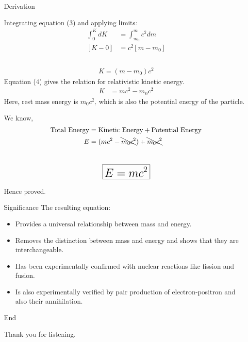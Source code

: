 \documentclass[11pt]{beamer}
\begin{document}
\begin{frame}[t,allowframebreaks]{Derivation}
        \framebreak

        Integrating equation (3) and applying limits:
        \begin{align*}
            \int_{0}^{K} dK &= \int_{m_0}^{m} c^2 dm\\[5pt]
            [K - 0] &= c^2 [m - m_0]\\
        \end{align*}~\\[-50pt]
        \begin{align}
            \boxed{K = (m - m_0) c^2}
        \end{align}
        Equation (4) gives the relation for relativistic kinetic energy.
        \begin{align*}
            K &= mc^2 - m_0 c^2
        \end{align*}
        Here, rest mass energy is $m_0 c^2$, which is also the potential energy of the particle.

        \framebreak

        We know,\\[-20pt]
        \begin{align*}
            \text{Total Energy} &= \text{Kinetic Energy} + \text{Potential Energy}\\
            E & = (mc^2 - \bcancel{m_0 c^2}) + \bcancel{m_0 c^2}\\
        \end{align*}~\\[-40pt]
        \begin{align*}
            \LARGE\boxed{E = mc^2}
        \end{align*}
        \begin{center}
            Hence proved.
        \end{center}
    \end{frame}

    \begin{frame}[t]{Significance}
        The resulting equation:\\[10pt]
        \begin{itemize}
            \item Provides a universal relationship between mass and energy.
            \item Removes the distinction between mass and energy and shows that they are interchangeable.
            \item Has been experimentally confirmed with nuclear reactions like fission and fusion.
            \item Is also experimentally verified by pair production of electron-positron and also their
            annihilation.
        \end{itemize}
    \end{frame}

    \begin{frame}{End}
        \begin{center}
            \huge Thank you for listening.
        \end{center}
    \end{frame}
\end{document}
